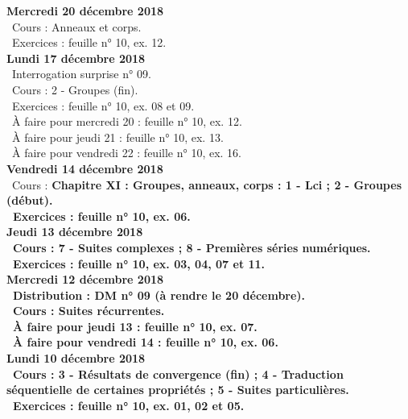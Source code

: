 \documentclass[12pt,a4paper]{article}
\begin{document}
\noindent\textbf{\bf Mercredi 20 décembre 2018}\\
\bu\ Cours : Anneaux et corps.\\ 
\bu\ Exercices : feuille n° 10, ex. 12.\vspace{.4cm}\\
 
\noindent\textbf{Lundi 17 décembre 2018}\\
\bu\ Interrogation surprise n° 09.\\
\bu\ Cours : 2 - Groupes (fin).\\ 
\bu\ Exercices : feuille n° 10, ex. 08 et 09.\\
\bu\ À faire pour mercredi 20 : feuille n° 10, ex. 12.\\
\bu\ À faire pour jeudi 21 : feuille n° 10, ex. 13.\\
\bu\ À faire pour vendredi 22 : feuille n° 10, ex. 16.\vspace{.4cm}\\ 

\noindent\textbf{Vendredi 14 décembre 2018}\\
\bu\ Cours : \bf Chapitre XI \rm : Groupes, anneaux, corps  : 1 - Lci ; 2 - Groupes (début).\\ 
\bu\ Exercices : feuille n° 10, ex. 06.\vspace{.4cm}\\
 
\noindent\textbf{Jeudi 13 décembre 2018}\\
\bu\ Cours : 7 - Suites complexes ; 8 - Premières séries numériques.\\
\bu\ Exercices : feuille n° 10, ex. 03, 04, 07 et 11.\vspace{.4cm}\\
 
\noindent\textbf{\bf Mercredi 12 décembre 2018}\\
\bu\ Distribution : DM n° 09 (à rendre le 20 décembre).\\
\bu\ Cours : Suites récurrentes.\\
\bu\ À faire pour jeudi 13 : feuille n° 10, ex. 07.\\
\bu\ À faire pour vendredi 14 : feuille n° 10, ex. 06.\vspace{.4cm}\\

\noindent\textbf{Lundi 10 décembre 2018}\\
\bu\ Cours : 3 - Résultats de convergence (fin) ; 4 - Traduction séquentielle de certaines propriétés ; 5 - Suites particulières.\\
\bu\ Exercices : feuille n° 10, ex. 01, 02 et 05.\vspace{.4cm}\\
 
\end{document}
